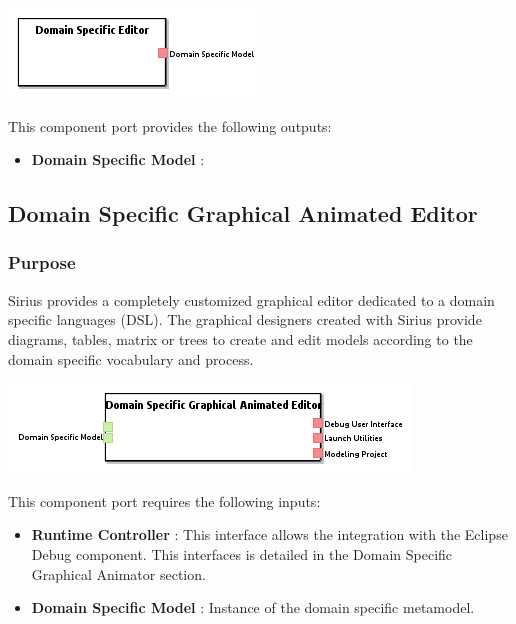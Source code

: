 \documentclass{gemoc} %
\begin{document}
\begin{center}
\includegraphics*[trim=0.0cm 0.0cm 0cm 0.0cm, clip=true]{../images/generated/Generated_Domain_Specific_Editor.png}
\end{center}


This component port provides the following outputs:
\begin{itemize}
  \item \textbf{Domain Specific Model} :
\end{itemize}


\subsection{Domain Specific Graphical Animated Editor}


\subsubsection{Purpose}
Sirius provides a completely customized graphical editor dedicated to a domain specific languages (DSL). The graphical designers created with Sirius
provide diagrams, tables, matrix or trees to create and edit models according to the domain specific vocabulary and process.

\begin{center}
\includegraphics*[trim=0.0cm 0.0cm 0cm 0.0cm, clip=true]{../images/generated/Generated_Domain_Specific_Graphical_Animated_Editor.png}
\end{center}

This component port requires the following inputs:
\begin{itemize}
  \item \textbf{Runtime Controller} :
This interface allows the integration with the Eclipse Debug component. This interfaces is detailed in the Domain Specific Graphical Animator section.
  \item \textbf{Domain Specific Model} :
Instance of the domain specific metamodel.
\end{itemize}
\end{document}
